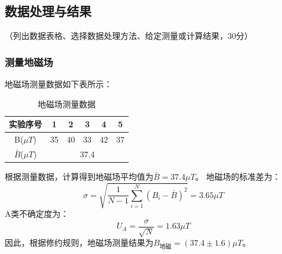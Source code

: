 \documentclass[10pt,a4paper]{ctexart}
\newcommand{\xiaosi}{\fontsize{12pt}{16pt}\selectfont}
\begin{document}
    \subsection{数据处理与结果}
    \xiaosi （列出数据表格、选择数据处理方法、给定测量或计算结果，30分）

    \subsubsection{测量地磁场}
    地磁场测量数据如下表所示：
    \begin{table}[H]
        \centering
        \begin{tabular}{|c|c|c|c|c|c|}
            \hline
            实验序号 & 1 & 2 & 3 & 4 & 5  \\
            \hline
            B($\mu T$) & 35 & 40 & 33 & 42 & 37  \\
            \hline
            $\bar{B}$($\mu T$) & \multicolumn{5}{c|}{37.4}   \\
            \hline
        \end{tabular}
        \caption{地磁场测量数据}
    \end{table}
    根据测量数据，计算得到地磁场平均值为$\bar{B} = 37.4 \mu T$。
    地磁场的标准差为：
    \[\sigma = \sqrt{\frac{1}{N-1}\sum_{i=1}^{N}(B_i - \bar{B})^2} = 3.65 \mu T\]
    A类不确定度为：
    \[U_A = \frac{\sigma}{\sqrt{N}} = 1.63 \mu T\]
    因此，根据修约规则，地磁场测量结果为$B_{地磁} = (37.4 \pm 1.6) \mu T$。
    
\end{document}
